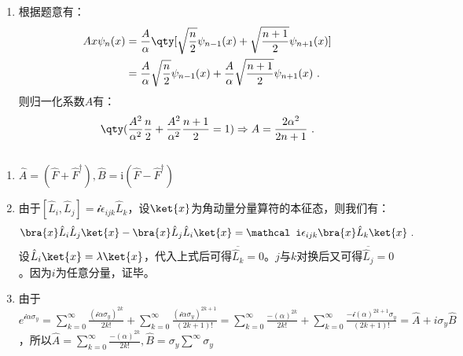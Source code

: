 
\begin{issues}
\issueDraft
\end{issues}

\subsection{ }
\begin{enumerate}
\item 根据题意有：
\begin{equation}
\begin{aligned}
Ax\psi_n(x)&=\frac{A}{\alpha}\qty[\sqrt{\frac{n}{2}}\psi_{n-1}(x)+\sqrt{\frac{n+1}{2}}\psi_{n+1}(x)] \\
&=\frac{A}{\alpha}\sqrt{\frac{n}{2}}\psi_{n-1}(x)+\frac{A}{\alpha}\sqrt{\frac{n+1}{2}}\psi_{n+1}(x)~.
\end{aligned}
\end{equation}
则归一化系数$A$有：
\begin{equation}
\qty(\frac{A^2}{{\alpha}^2}\frac{n}{2}+\frac{A^2}{{\alpha}^2}\frac{n+1}{2}=1)\Rightarrow A=\frac{2\alpha^2}{2n+1}~.
\end{equation}
\end{enumerate}
\subsection{ }
\begin{enumerate}
\item $\hat A=(\hat F+\hat F^\dagger),\hat B=\mathrm i(\hat F-\hat F^\dagger)$
\item 
由于$[\hat L_i,\hat L_j]=\mathcal i\epsilon_{ijk}\hat L_k$，设$\ket{x}$为角动量分量算符的本征态，则我们有：
\begin{equation}
\bra{x}\hat L_i\hat L_j\ket{x}-\bra{x}\hat L_j\hat L_i\ket{x}=\mathcal i\epsilon_{ijk}\bra{x}\hat L_k\ket{x}~.
\end{equation}
设$\hat L_i\ket{x}=\lambda\ket{x}$，代入上式后可得$\overline {\hat L_k}=0$。$j$与$k$对换后又可得$\overline {\hat L_j}=0$。因为$i$为任意分量，证毕。
\item 由于$e^{\mathcal i\alpha \sigma_y}=\sum\limits^{\infty}_{k=0}\frac{(\mathcal i \alpha \sigma_y)^{2k}}{2k!}+\sum\limits^{\infty}_{k=0}\frac{(\mathcal i \alpha \sigma_y)^{2k+1}}{(2k+1)!}=\sum\limits^{\infty}_{k=0}\frac{- (\alpha )^{2k}}{2k!}+\sum\limits^{\infty}_{k=0}\frac{-\mathcal i( \alpha )^{2k+1}\sigma_y}{(2k+1)!}=\hat A+i\sigma_y \hat B$，所以$\hat A=\sum\limits^{\infty}_{k=0}\frac{- (\alpha )^{2k}}{2k!},\hat B=\sigma_y\sum\limits^{\infty} \sigma_y$
\end{enumerate}
\subsection{ }
\subsection{ }
\subsection{ }
